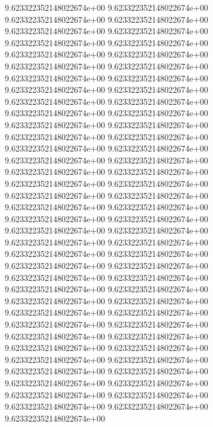 9.623322352148022674e+00	9.623322352148022674e+00	9.623322352148022674e+00	9.623322352148022674e+00	9.623322352148022674e+00	9.623322352148022674e+00	9.623322352148022674e+00	9.623322352148022674e+00	9.623322352148022674e+00	9.623322352148022674e+00	9.623322352148022674e+00	9.623322352148022674e+00	9.623322352148022674e+00	9.623322352148022674e+00	9.623322352148022674e+00	9.623322352148022674e+00	9.623322352148022674e+00	9.623322352148022674e+00	9.623322352148022674e+00	9.623322352148022674e+00	9.623322352148022674e+00	9.623322352148022674e+00	9.623322352148022674e+00	9.623322352148022674e+00	9.623322352148022674e+00	9.623322352148022674e+00	9.623322352148022674e+00	9.623322352148022674e+00	9.623322352148022674e+00	9.623322352148022674e+00	9.623322352148022674e+00	9.623322352148022674e+00	9.623322352148022674e+00	9.623322352148022674e+00	9.623322352148022674e+00	9.623322352148022674e+00	9.623322352148022674e+00	9.623322352148022674e+00	9.623322352148022674e+00	9.623322352148022674e+00	9.623322352148022674e+00	9.623322352148022674e+00	9.623322352148022674e+00	9.623322352148022674e+00	9.623322352148022674e+00	9.623322352148022674e+00	9.623322352148022674e+00	9.623322352148022674e+00	9.623322352148022674e+00	9.623322352148022674e+00	9.623322352148022674e+00	9.623322352148022674e+00	9.623322352148022674e+00	9.623322352148022674e+00	9.623322352148022674e+00	9.623322352148022674e+00	9.623322352148022674e+00	9.623322352148022674e+00	9.623322352148022674e+00	9.623322352148022674e+00	9.623322352148022674e+00	9.623322352148022674e+00	9.623322352148022674e+00	9.623322352148022674e+00	9.623322352148022674e+00	9.623322352148022674e+00	9.623322352148022674e+00	9.623322352148022674e+00	9.623322352148022674e+00	9.623322352148022674e+00	9.623322352148022674e+00
